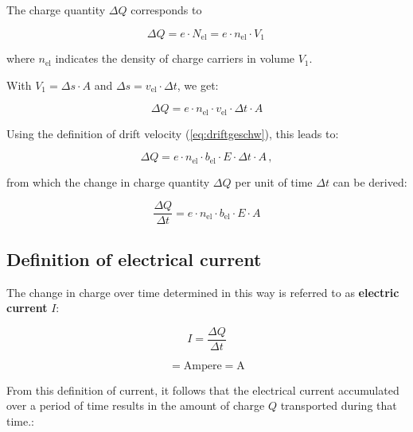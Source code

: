 { 
The charge quantity $\Delta Q$ corresponds to

\begin{equation*}	
	\Delta Q = e \cdot N_\mathrm{el} = e \cdot n_\mathrm{el} \cdot V_1 \,
\end{equation*}

where $n_\mathrm{el}$ indicates the density of charge carriers in volume $V_1$.

With $V_1 = \Delta s \cdot A$ and $\Delta s = v_\mathrm{el}  \cdot \Delta t$, we get:

\begin{equation*}	
	\Delta Q =  e \cdot n_\mathrm{el} \cdot v_\mathrm{el} \cdot \Delta t \cdot A
\end{equation*}

Using the definition of drift velocity (\ref{eq:driftgeschw}), this leads to:

\begin{equation*}	
	\Delta Q =  e \cdot n_\mathrm{el} \cdot b_\mathrm{el} \cdot E \cdot \Delta t \cdot A \, ,
\end{equation*}

from which the change in charge quantity $\Delta Q$ per unit of time $\Delta t$ can be derived:

\begin{equation*}	
	\frac{\Delta Q}{\Delta t} =  e \cdot n_\mathrm{el} \cdot b_\mathrm{el} \cdot E \cdot A
\end{equation*}




\subsection{Definition of electrical current}

The change in charge over time determined in this way is referred to as \textbf{electric current} $I$:

\begin{equation}
	I = \frac{\Delta Q}{\Delta t}
	\label{eq:stromdef}
\end{equation}



\begin{equation*}
	[I] = \mathrm{Ampere} = \mathrm{A}
\end{equation*}



From this definition of current, it follows that the electrical current accumulated over a period of time 
results in the amount of charge $Q$ transported during that time.:

}
